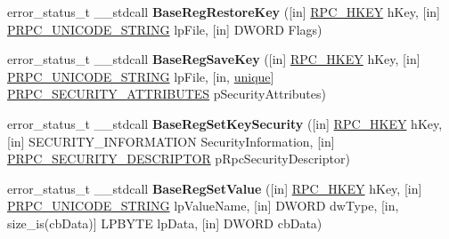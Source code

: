 \begin{DoxyCompactItemize}
\item 
\mbox{\label{interfacewinreg_ae0e54bc8a96e82de3fbd85d893a2619f}} 
error\+\_\+status\+\_\+t \+\_\+\+\_\+stdcall {\bfseries Base\+Reg\+Restore\+Key} (\mbox{[}in\mbox{]} \hyperlink{interfacevoid}{R\+P\+C\+\_\+\+H\+K\+EY} h\+Key, \mbox{[}in\mbox{]} \hyperlink{struct___r_p_c___u_n_i_c_o_d_e___s_t_r_i_n_g}{P\+R\+P\+C\+\_\+\+U\+N\+I\+C\+O\+D\+E\+\_\+\+S\+T\+R\+I\+NG} lp\+File, \mbox{[}in\mbox{]} D\+W\+O\+RD Flags)
\item 
\mbox{\label{interfacewinreg_a8db29849eda27fab4d6f8afba2d9e924}} 
error\+\_\+status\+\_\+t \+\_\+\+\_\+stdcall {\bfseries Base\+Reg\+Save\+Key} (\mbox{[}in\mbox{]} \hyperlink{interfacevoid}{R\+P\+C\+\_\+\+H\+K\+EY} h\+Key, \mbox{[}in\mbox{]} \hyperlink{struct___r_p_c___u_n_i_c_o_d_e___s_t_r_i_n_g}{P\+R\+P\+C\+\_\+\+U\+N\+I\+C\+O\+D\+E\+\_\+\+S\+T\+R\+I\+NG} lp\+File, \mbox{[}in, \hyperlink{interfaceunique}{unique}\mbox{]} \hyperlink{struct___r_p_c___s_e_c_u_r_i_t_y___a_t_t_r_i_b_u_t_e_s}{P\+R\+P\+C\+\_\+\+S\+E\+C\+U\+R\+I\+T\+Y\+\_\+\+A\+T\+T\+R\+I\+B\+U\+T\+ES} p\+Security\+Attributes)
\item 
\mbox{\label{interfacewinreg_add88ef86ecee6c37a79953d47ed0bea9}} 
error\+\_\+status\+\_\+t \+\_\+\+\_\+stdcall {\bfseries Base\+Reg\+Set\+Key\+Security} (\mbox{[}in\mbox{]} \hyperlink{interfacevoid}{R\+P\+C\+\_\+\+H\+K\+EY} h\+Key, \mbox{[}in\mbox{]} S\+E\+C\+U\+R\+I\+T\+Y\+\_\+\+I\+N\+F\+O\+R\+M\+A\+T\+I\+ON Security\+Information, \mbox{[}in\mbox{]} \hyperlink{struct___r_p_c___s_e_c_u_r_i_t_y___d_e_s_c_r_i_p_t_o_r}{P\+R\+P\+C\+\_\+\+S\+E\+C\+U\+R\+I\+T\+Y\+\_\+\+D\+E\+S\+C\+R\+I\+P\+T\+OR} p\+Rpc\+Security\+Descriptor)
\item 
\mbox{\label{interfacewinreg_a9747b916ff7190c254529f4d200d5dd7}} 
error\+\_\+status\+\_\+t \+\_\+\+\_\+stdcall {\bfseries Base\+Reg\+Set\+Value} (\mbox{[}in\mbox{]} \hyperlink{interfacevoid}{R\+P\+C\+\_\+\+H\+K\+EY} h\+Key, \mbox{[}in\mbox{]} \hyperlink{struct___r_p_c___u_n_i_c_o_d_e___s_t_r_i_n_g}{P\+R\+P\+C\+\_\+\+U\+N\+I\+C\+O\+D\+E\+\_\+\+S\+T\+R\+I\+NG} lp\+Value\+Name, \mbox{[}in\mbox{]} D\+W\+O\+RD dw\+Type, \mbox{[}in, size\+\_\+is(cb\+Data)\mbox{]} L\+P\+B\+Y\+TE lp\+Data, \mbox{[}in\mbox{]} D\+W\+O\+RD cb\+Data)
\item 
\mbox{\label{interfacewinreg_ab898d4b54995c23ae84f5b5611281c09}} 

\end{DoxyCompactItemize}
